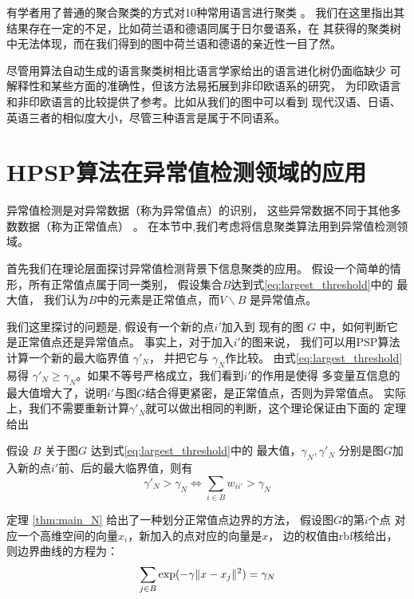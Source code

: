 有学者用了普通的聚合聚类的方式对10种常用语言进行聚类 \cite{al2017characterization} 。
我们在这里指出其结果存在一定的不足，比如荷兰语和德语同属于日尔曼语系，在
其获得的聚类树中无法体现，而在我们得到的图中荷兰语和德语的亲近性一目了然。

尽管用算法自动生成的语言聚类树相比语言学家给出的语言进化树仍面临缺少
可解释性和某些方面的准确性，但该方法易拓展到非印欧语系的研究，
为印欧语言和非印欧语言的比较提供了参考。比如从我们的图中可以看到
现代汉语、日语、英语三者的相似度大小，尽管三种语言是属于不同语系。



\section{HPSP算法在异常值检测领域的应用}
异常值检测是对异常数据（称为异常值点）的识别，
这些异常数据不同于其他多数数据（称为正常值点）
\citep{grubbs1969procedures}。
在本节中,我们考虑将信息聚类算法用到异常值检测领域。

首先我们在理论层面探讨异常值检测背景下信息聚类的应用。
假设一个简单的情形，所有正常值点属于同一类别，
假设集合$B$达到式\eqref{eq:largest_threshold}中的
最大值，
我们认为$B$中的元素是正常值点，而$V\backslash B$ 是异常值点。

我们这里探讨的问题是, 假设有一个新的点$i'$加入到
现有的图 $G$ 中，如何判断它是正常值点还是异常值点。 
事实上，对于加入$i'$的图来说，
我们可以用PSP算法计算一个新的最大临界值
$\gamma'_N$，
并把它与 $\gamma_N$作比较。 由式\eqref{eq:largest_threshold}易得
$\gamma'_N \geq \gamma_N$。如果不等号严格成立，我们看到$i'$的作用是使得
多变量互信息的最大值增大了，说明$i'$与图$G$结合得更紧密，是正常值点，否则为异常值点。
实际上，我们不需要重新计算$\gamma'_N$就可以做出相同的判断，这个理论保证由下面的
定理给出
\begin{theorem}\label{thm:main_N}
  假设 $B$ 关于图$G$ 达到式\eqref{eq:largest_threshold}中的
  最大值，$\gamma_N, \gamma'_N$ 分别是图$G$加入新的点$i'$前、后的最大临界值，则有
\begin{equation}
\gamma'_N > \gamma_N \iff  \sum_{i \in B} w_{ii'} > \gamma_N 
\end{equation}
\end{theorem}
定理 \ref{thm:main_N} 给出了一种划分正常值点边界的方法，
假设图$G$的第$i$个点
对应一个高维空间的向量$x_i$，新加入的点对应的向量是$x$，
边的权值由rbf核给出，则边界曲线的方程为：
\begin{equation}\label{eq:sum_exp_gamma_N}
  \sum_{j \in B} \exp(-\gamma \lVert x - x_j\rVert^2)= \gamma_N
\end{equation}

